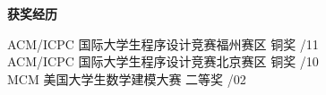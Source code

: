 \documentclass[a4paper]{article}
\newenvironment{changemargin}[2]{%
  \begin{list}{}{%
    \setlength{\topsep}{0pt}%
    \setlength{\leftmargin}{#1}%
    \setlength{\rightmargin}{#2}%
    \setlength{\listparindent}{\parindent}%
    \setlength{\itemindent}{\parindent}%
    \setlength{\parsep}{\parskip}%
  }%
  \item[]}{\end{list}
}
\newcommand{\lineover}{
	\begin{changemargin}{-0.05in}{-0.05in}
		\vspace*{-8pt}
		\hrulefill \\
		\vspace*{-2pt}
	\end{changemargin}
}
\newcommand{\header}[1]{
	\begin{changemargin}{-0.5in}{-0.5in}
	\fontsize{12}{14} \scshape{\textbf{#1}}\\
	\end{changemargin}
}
\newenvironment{body} {
	\vspace*{-16pt}
	\begin{changemargin}{-0.5in}{-0.5in}
  }	
	{\end{changemargin}
}
\begin{document}
\medskip


\header{获奖经历}
\begin{body}
	\vspace{14pt}
	{{\fontarial ACM/ICPC} 国际大学生程序设计竞赛福州赛区 铜奖} \hfill {/11}\\
	{{\fontarial ACM/ICPC} 国际大学生程序设计竞赛北京赛区 铜奖} \hfill {/10}\\
	{{\fontarial MCM} 美国大学生数学建模大赛 二等奖} \hfill {/02}\\
\end{body}

\medskip



	
	
\end{document}
